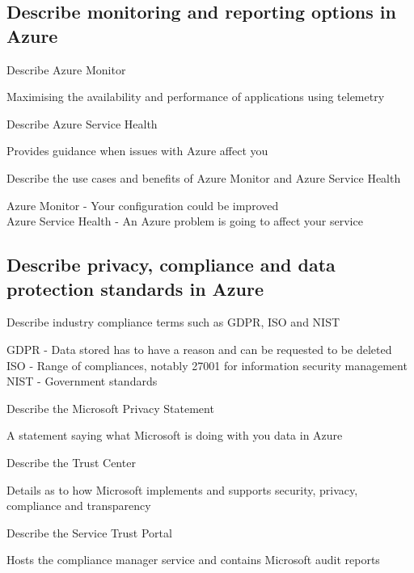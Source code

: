 \documentclass[addpoints]{exam}
\begin{document}
\begin{questions}
\subsection{Describe monitoring and reporting options in Azure}
\question Describe Azure Monitor
\begin{solution}[2in]
	Maximising the availability and performance of applications using telemetry
\end{solution}
\question Describe Azure Service Health
\begin{solution}[2in]
	Provides guidance when issues with Azure affect you
\end{solution}

\question Describe the use cases and benefits of Azure Monitor and Azure Service Health
\begin{solution}[2in]
	Azure Monitor - Your configuration could be improved\\
	Azure Service Health - An Azure problem is going to affect your service
\end{solution}

\subsection{Describe privacy, compliance and data protection standards in Azure}

\question Describe industry compliance terms such as GDPR, ISO and NIST
\begin{solution}[2in]
	GDPR - Data stored has to have a reason and can be requested to be deleted\\
	ISO - Range of compliances, notably 27001 for information security management\\
	NIST - Government standards
\end{solution}

\question Describe the Microsoft Privacy Statement
\begin{solution}[2in]
	A statement saying what Microsoft is doing with you data in Azure
\end{solution}

\question Describe the Trust Center
\begin{solution}[2in]
	Details as to how Microsoft implements and supports security, privacy, compliance and transparency
\end{solution}

\question Describe the Service Trust Portal
\begin{solution}[2in]
	Hosts the compliance manager service and contains Microsoft audit reports
\end{solution}


\end{questions}
\end{document}
